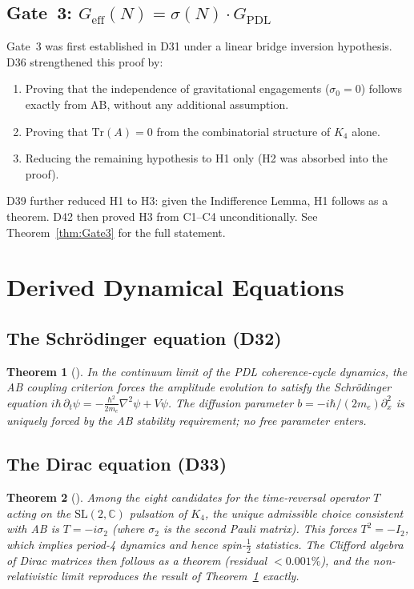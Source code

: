 \documentclass[11pt,a4paper]{article}
\theoremstyle{plain}
\newtheorem{theorem}{Theorem}[section]
\theoremstyle{definition}
\theoremstyle{remark}
\newcommand{\Geff}{G_{\mathrm{eff}}}
\newcommand{\GPDL}{G_{\mathrm{PDL}}}
\newcommand{\sigmaN}{\sigma(N)}
\begin{document}
\subsection{Gate~3: \texorpdfstring{$\Geff(N)=\sigmaN\cdot\GPDL$}{Geff(N)=sigmaN·GPDL}}
\label{subsec:gate3}
Gate~3 was first established in D31 under a linear bridge inversion hypothesis. D36 strengthened this proof by:
\begin{enumerate}
\item Proving that the independence of gravitational engagements ($\sigma_0=0$) follows exactly from AB, without any additional assumption.
\item Proving that $\mathrm{Tr}(A)=0$ from the combinatorial structure of $K_4$ alone.
\item Reducing the remaining hypothesis to H1 only (H2 was absorbed into the proof).
\end{enumerate}
D39 further reduced H1 to H3: given the Indifference Lemma, H1 follows as a theorem. D42 then proved H3 from C1--C4 unconditionally. See Theorem~\ref{thm:Gate3} for the full statement.

\section{Derived Dynamical Equations}
\label{sec:dynamics}

\subsection{The Schr\"odinger equation (D32)}
\label{subsec:schrodinger}
\begin{theorem}[\cite{D32}]
\label{thm:Schrodinger}
In the continuum limit of the PDL coherence-cycle dynamics, the AB coupling criterion forces the amplitude evolution to satisfy the Schr\"odinger equation $i\hbar\,\partial_t\psi=-\frac{\hbar^2}{2m_e}\nabla^2\psi+V\psi$. The diffusion parameter $b=-i\hbar/(2m_e)\partial_x^2$ is uniquely forced by the AB stability requirement; no free parameter enters.
\end{theorem}

\subsection{The Dirac equation (D33)}
\label{subsec:dirac}
\begin{theorem}[\cite{D33}]
\label{thm:Dirac}
Among the eight candidates for the time-reversal operator $T$ acting on the $\mathrm{SL}(2,\mathbb{C})$ pulsation of $K_4$, the unique admissible choice consistent with AB is $T=-i\sigma_2$ (where $\sigma_2$ is the second Pauli matrix). This forces $T^2=-I_2$, which implies period-4 dynamics and hence spin-$\tfrac{1}{2}$ statistics. The Clifford algebra of Dirac matrices then follows as a theorem (residual $<0.001\%$), and the non-relativistic limit reproduces the result of Theorem~\ref{thm:Schrodinger} exactly.
\end{theorem}
\end{document}
